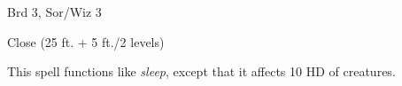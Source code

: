 
\begin{description*}
\item[Level:] Brd 3, Sor/Wiz 3
\item[Range:] Close (25 ft. + 5 ft./2 levels)
\end{description*}

This spell functions like \textit{sleep}, except that it affects 10 HD of creatures.